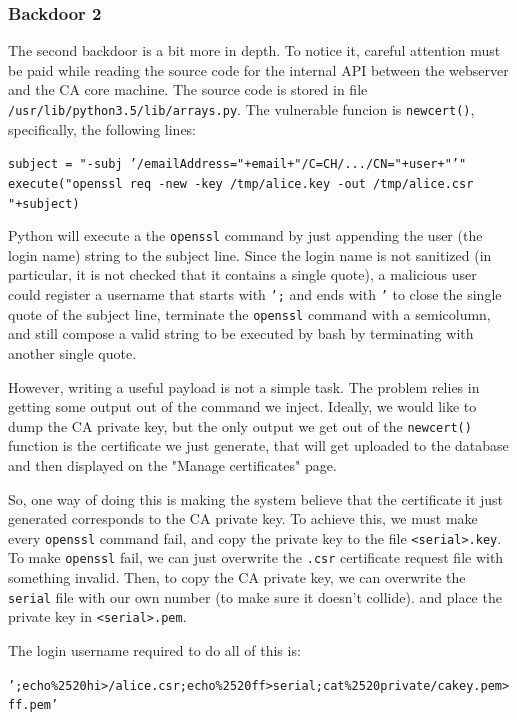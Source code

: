 \documentclass[english]{article}
\begin{document}
{\subsubsection*{Backdoor 2}
The second backdoor is a bit more in depth. To notice it, careful attention must be paid while reading the source code for the internal
API between the webserver and the CA core machine. The source code is stored in file \texttt{/usr/lib/python3.5/lib/arrays.py}. 
The vulnerable funcion is \texttt{newcert()}, specifically, the following lines:

\noindent
\texttt{subject = "-subj '/emailAddress="+email+"/C=CH/.../CN="+user+"'" \\
execute("openssl req -new -key /tmp/alice.key -out /tmp/alice.csr "+subject)
}

Python will execute a the \texttt{openssl} command by just appending the user
(the login name) string to the subject line.  Since the login name is not
sanitized (in particular, it is not checked that it contains a single quote), a
malicious user could register a username that starts with \texttt{';} and ends
with \texttt{'} to close the single quote of the subject line, terminate the
\texttt{openssl} command with a semicolumn, and still compose a valid string to
be executed by bash by terminating with another single quote. 

However, writing a useful payload is not a simple task. The problem relies in
getting some output out of the command we inject.  Ideally, we would like to
dump the CA private key, but the only output we get out of the
\texttt{newcert()} function is the certificate we just generate, that will get
uploaded to the database and then displayed on the "Manage certificates" page.

So, one way of doing this is making the system believe that the certificate it
just generated corresponds to the CA private key.  To achieve this, we must
make every \texttt{openssl} command fail, and copy the private key to the file
\texttt{<serial>.key}.  To make \texttt{openssl} fail, we can just overwrite
the \texttt{.csr} certificate request file with something invalid.  Then, to
copy the CA private key, we can overwrite the \texttt{serial} file with our own
number (to make sure it doesn't collide).  and place the private key in
\texttt{<serial>.pem}.

The login username required to do all of this is:

\noindent
\texttt{';echo\%2520hi>/alice.csr;echo\%2520ff>serial;cat\%2520private/cakey.pem>ff.pem'}

}
\end{document}
